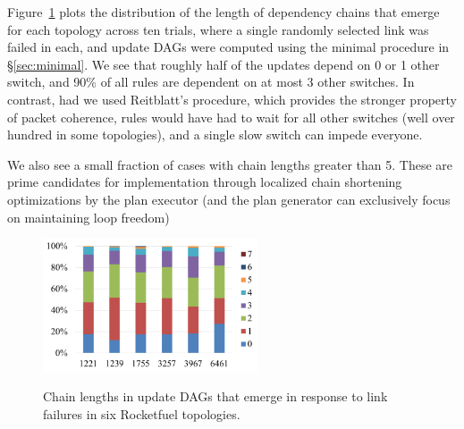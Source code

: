 Figure~\ref{fig:as} plots the distribution of the length of dependency chains that emerge for each topology across ten trials, where a single randomly selected link was failed in each, and update DAGs were computed using the minimal procedure in \S\ref{sec:minimal}. We see that roughly half of the updates depend on 0 or 1 other switch, and 90\% of all rules are dependent on at most 3 other switches. In contrast, had we used Reitblatt's procedure, which provides the stronger property of packet coherence, rules would have had to wait for all other switches (well over hundred in some topologies), and a single slow switch can impede everyone.

We also see a small fraction of cases with chain lengths greater than 5. These are prime candidates for implementation through localized chain shortening optimizations by the plan executor (and the plan generator can exclusively focus on maintaining loop freedom)


\begin{figure}[t!]
  \centering
  \includegraphics[width=2.5in]{figures/as.png}\\
  \caption{Chain lengths in update DAGs that emerge in response to link failures in six Rocketfuel topologies.}\label{fig:as}
\end{figure}


